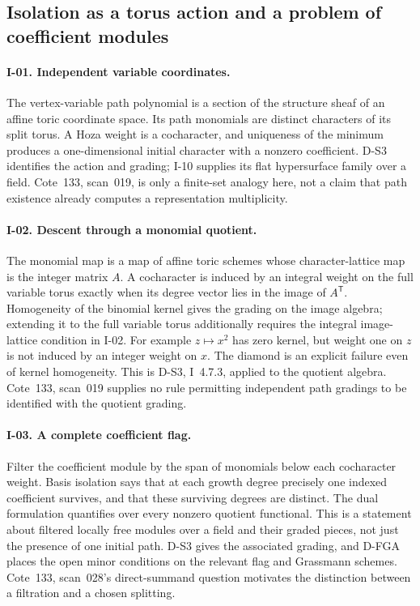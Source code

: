 \documentclass[11pt,a4paper]{article}
\theoremstyle{definition}\newtheorem{definition}{Definition}
\begin{document}
\subsection{Isolation as a torus action and a problem of coefficient modules}

\paragraph{I-01. Independent variable coordinates.}
The vertex-variable path polynomial is a section of the structure sheaf of an affine toric coordinate space. Its path monomials are distinct characters of its split torus. A Hoza weight is a cocharacter, and uniqueness of the minimum produces a one-dimensional initial character with a nonzero coefficient. D-S3 identifies the action and grading; I-10 supplies its flat hypersurface family over a field. Cote~133, scan~019, is only a finite-set analogy here, not a claim that path existence already computes a representation multiplicity.

\paragraph{I-02. Descent through a monomial quotient.}
The monomial map is a map of affine toric schemes whose character-lattice map is the integer matrix $A$. A cocharacter is induced by an integral weight on the full variable torus exactly when its degree vector lies in the image of $A^{\mathsf T}$. Homogeneity of the binomial kernel gives the grading on the image algebra; extending it to the full variable torus additionally requires the integral image-lattice condition in I-02. For example $z\mapsto x^2$ has zero kernel, but weight one on $z$ is not induced by an integer weight on $x$. The diamond is an explicit failure even of kernel homogeneity. This is D-S3, I~4.7.3, applied to the quotient algebra. Cote~133, scan~019 supplies no rule permitting independent path gradings to be identified with the quotient grading.

\paragraph{I-03. A complete coefficient flag.}
Filter the coefficient module by the span of monomials below each cocharacter weight. Basis isolation says that at each growth degree precisely one indexed coefficient survives, and that these surviving degrees are distinct. The dual formulation quantifies over every nonzero quotient functional. This is a statement about filtered locally free modules over a field and their graded pieces, not just the presence of one initial path. D-S3 gives the associated grading, and D-FGA places the open minor conditions on the relevant flag and Grassmann schemes. Cote~133, scan~028's direct-summand question motivates the distinction between a filtration and a chosen splitting.
\end{document}
